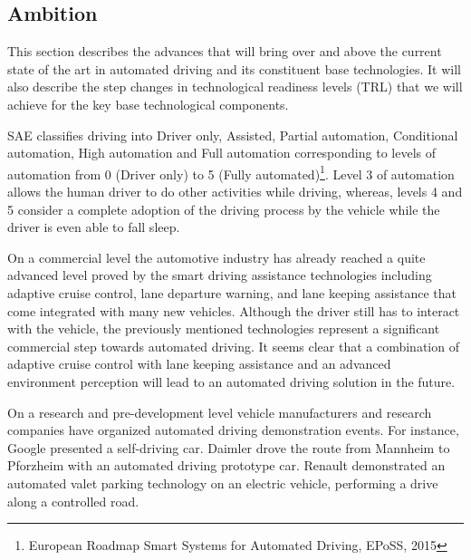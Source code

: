 
\subsection{Ambition}
\label{sec:ambition}

This section describes the advances that \Project{} will bring over and above the current state of the art in automated driving and its constituent base technologies. It will also describe the step changes in technological readiness levels (TRL) that we will achieve for the key base technological components.

SAE classifies driving into Driver only, Assisted, Partial automation, Conditional automation, High automation and Full automation corresponding to levels of automation from 0 (Driver only) to 5 (Fully automated)\footnote{European Roadmap Smart Systems for Automated Driving, EPoSS, 2015}. Level 3 of automation allows the human driver to do other activities while driving, whereas, levels 4 and 5 consider a complete adoption of the driving process by the vehicle while the driver is even able to fall sleep.  

On a commercial level the automotive industry has already reached a quite advanced level proved by the smart driving assistance technologies including adaptive cruise control, lane departure warning, and lane keeping assistance that come integrated with many new vehicles. Although the driver still has to interact with the vehicle, the previously mentioned technologies represent a significant commercial step towards automated driving. It seems clear that a combination of adaptive cruise control with lane keeping assistance and an advanced environment perception will lead to an automated driving solution in the future.

On a research and pre-development level vehicle manufacturers and research companies have organized automated driving demonstration events. For instance, Google presented a self-driving car. Daimler drove the route from Mannheim to Pforzheim with an automated driving prototype car.  Renault demonstrated an automated valet parking technology on an electric vehicle, performing a drive along a controlled road.

